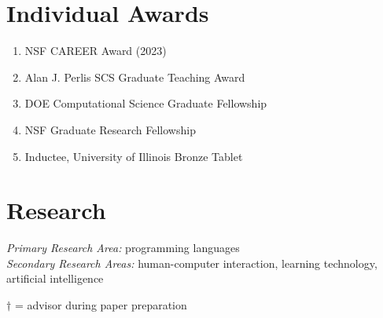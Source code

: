 \documentclass[10pt,letterpaper]{article}
\begin{document}
\section*{Individual Awards}
\begin{enumerate}
  \item NSF CAREER Award (2023)
  \item {Alan J. Perlis SCS Graduate Teaching Award}
  \item DOE Computational Science Graduate Fellowship
  \item NSF Graduate Research Fellowship
  \item Inductee, University of Illinois Bronze Tablet
\end{enumerate}

\section*{Research}

\textit{Primary Research Area:} programming languages \\
\textit{Secondary Research Areas:} human-computer interaction, learning technology, artificial intelligence

\newcommand{\advisee}[1]{#1$^\dagger$}
$\dagger$ = advisor during paper preparation
\end{document}
